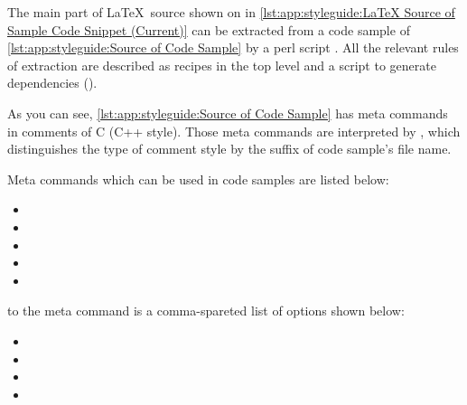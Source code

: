 \begin{fcvref}
The main part of \LaTeX\ source shown on
 in
\cref{lst:app:styleguide:LaTeX Source of Sample Code Snippet (Current)}
can be extracted from a code sample of
\cref{lst:app:styleguide:Source of Code Sample} by a perl script
.
All the relevant rules of extraction are described as recipes in the
top level  and a script to generate dependencies
().
\end{fcvref}

\begin{listing*}
\vspace*{-9pt}
\caption{Source of Code Sample with ``snippet'' Meta Command}
\label{lst:app:styleguide:Source of Code Sample}
\end{listing*}

As you can see, \cref{lst:app:styleguide:Source of Code Sample}
has meta commands in comments of C (C++ style).
Those meta commands are interpreted by ,
which distinguishes the type of comment style by the suffix of code
sample's file name.

Meta commands which can be used in code samples are listed below:

\begin{itemize}[noitemsep]
\item {}
\item {}
\item {}
\item \co{\\fcvexclude}
\item \co{\\fcvblank}
\end{itemize}

 to the  meta command
is a comma-spareted list of options shown below:

\begin{itemize}[noitemsep]
\item {}
\item {}
\item {}
\item {}
\end{itemize}

